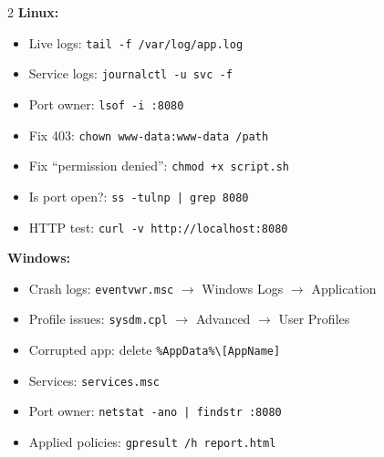\documentclass[11pt, letterpaper]{article}
\begin{document}
\begin{tcolorbox}[colback=part2bg, colframe=sectiongreen,
  title={\bfseries Linux \& Windows Quick Commands}, arc=3pt, boxrule=1pt]
\footnotesize
\begin{multicols}{2}
\textbf{Linux:}
\begin{itemize}[noitemsep, leftmargin=*]
  \item Live logs: \texttt{tail -f /var/log/app.log}
  \item Service logs: \texttt{journalctl -u svc -f}
  \item Port owner: \texttt{lsof -i :8080}
  \item Fix 403: \texttt{chown www-data:www-data /path}
  \item Fix ``permission denied'': \texttt{chmod +x script.sh}
  \item Is port open?: \texttt{ss -tulnp | grep 8080}
  \item HTTP test: \texttt{curl -v http://localhost:8080}
\end{itemize}
\columnbreak
\textbf{Windows:}
\begin{itemize}[noitemsep, leftmargin=*]
  \item Crash logs: \texttt{eventvwr.msc} $\to$ Windows Logs $\to$ Application
  \item Profile issues: \texttt{sysdm.cpl} $\to$ Advanced $\to$ User Profiles
  \item Corrupted app: delete \texttt{\%AppData\%\textbackslash[AppName]}
  \item Services: \texttt{services.msc}
  \item Port owner: \texttt{netstat -ano | findstr :8080}
  \item Applied policies: \texttt{gpresult /h report.html}
\end{itemize}
\end{multicols}
\end{tcolorbox}


\vspace{4pt}
\end{document}
